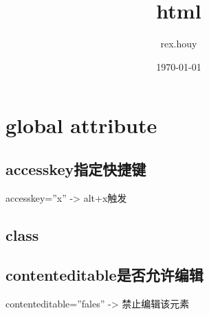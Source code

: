 \documentclass[11pt]{article}
\title{html}
\author{rex.houy}
\date{\today}
\begin{document}
\maketitle

\setcounter{tocdepth}{3}
\tableofcontents
\vspace*{1cm}
\section{global attribute}
\label{sec-1}
\subsection{accesskey指定快捷键}
\label{sec-1-1}

accesskey=''x'' -> alt+x触发
\subsection{class}
\label{sec-1-2}
\subsection{contenteditable是否允许编辑}
\label{sec-1-3}

contenteditable=''fales'' -> 禁止编辑该元素
\subsection{}
\end{document}
